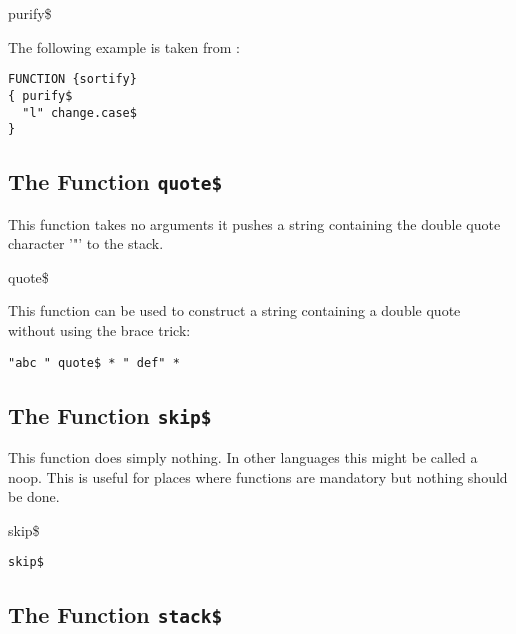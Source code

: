 \begin{BstFunction}{purify\$}
\end{BstFunction}

The following example is taken from :

\begin{lstlisting}[language=bst]
FUNCTION {sortify}
{ purify$
  "l" change.case$
}
\end{lstlisting}


\subsection{The Function \texttt{quote\$}}%

This function takes no arguments it pushes a string containing the
double quote character '"' to the stack.

\begin{BstFunction}{quote\$}
\end{BstFunction}

This function can be used to construct a string containing a double
quote without using the brace trick:

\begin{lstlisting}[language=bst]
  "abc " quote$ * " def" * 
\end{lstlisting}\fctIndex{*}


\subsection{The Function \texttt{skip\$}}%

This function does simply nothing. In other languages this might be
called a noop. This is useful for places where functions are
mandatory but nothing should be done.

\begin{BstFunction}{skip\$}
\end{BstFunction}

\begin{lstlisting}[language=bst]
  skip$
\end{lstlisting}


\subsection{The Function \texttt{stack\$}}%

